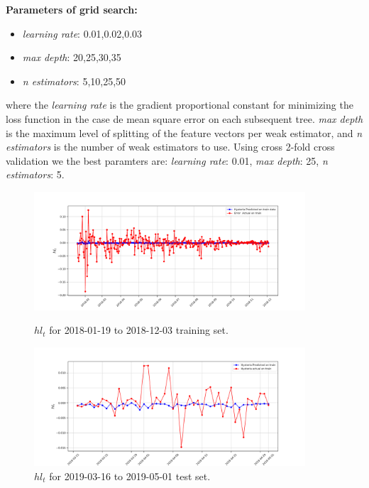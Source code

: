 \textbf{Parameters of grid search:}

\begin{itemize}
	\item \emph{learning rate}: 0.01,0.02,0.03
	\item \emph{max depth}:  20,25,30,35 
	\item \emph{n estimators}: 5,10,25,50
\end{itemize}


where the  \emph{learning rate} is the gradient proportional constant for minimizing the loss function in the case de mean square error on each subsequent tree. \emph{max depth} is the maximum level of splitting of the feature vectors per weak estimator, and \emph{n estimators} is the number of weak estimators to use. Using cross 2-fold cross validation we the best paramters are: \emph{learning rate}: 0.01, \emph{max depth}: 25, \emph{n estimators}: 5.



\begin{figure}[h!]
	\centering
	\begin{minipage}[b]{0.8\textwidth}
		\includegraphics[width=0.9\textwidth]{data/2018_hys_senti.pdf}
		\caption{ $hl_{t}$ for 2018-01-19  to  2018-12-03 training set.}
		\label{fig:sent2018}
	\end{minipage}
	\hfill
	\begin{minipage}[b]{0.8\textwidth}
		\includegraphics[width=0.9\textwidth]{data/2019_hys_senti.pdf}
		\caption{$hl_{t}$  for 2019-03-16 to 2019-05-01 test set.}
		\label{fig:sent2019}
	\end{minipage}
\end{figure}




